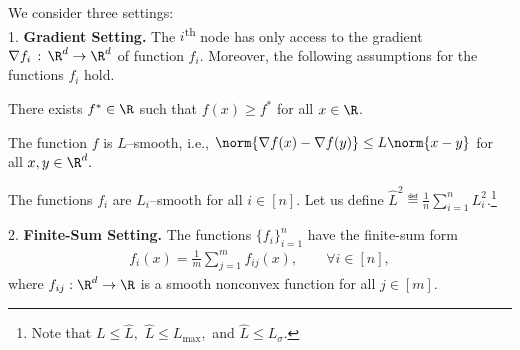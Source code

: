 \documentclass{article}
\begin{document}
We consider three settings: \\
1. \textbf{Gradient Setting.}
The $i$\textsuperscript{th} node has only access to the gradient $\nabla f_i \,:\,\R^d \rightarrow \R^d$ of function $f_i$. Moreover, the following assumptions for the functions $f_i$ hold.
\begin{assumption}
    \label{ass:lower_bound}
    There exists $f^* \in \R$ such that $f(x) \geq f^*$ for all $x \in \R$.
\end{assumption}
\begin{assumption}
    \label{ass:lipschitz_constant}
    The function $f$ is $L$--smooth, i.e., $\norm{\nabla f(x) - \nabla f(y)} \leq L \norm{x - y}$ for all $x, y \in \R^d.$
\end{assumption}
\begin{assumption} \leavevmode
    \label{ass:nodes_lipschitz_constant}
    The functions $f_i$ are $L_i$--smooth for all $i \in [n]$. Let us define $\widehat{L}^2 \eqdef \frac{1}{n} \sum_{i=1}^{n} L_i^2.$\footnote{Note that $L \leq \widehat{L},$ $\widehat{L} \leq L_{\max},$ and $\widehat{L} \leq L_{\sigma}.$}
\end{assumption}
2. \textbf{Finite-Sum Setting.}
The functions $\{f_i\}_{i=1}^n$ have the finite-sum form
\begin{align}
    \label{eq:task_minibatch} f_i(x) = \frac{1}{m}\sum \limits_{j=1}^m f_{ij}(x), \qquad \forall i \in [n],
\end{align}
where $f_{ij} :\R^d  \rightarrow \R$ is a smooth nonconvex  function for all $j \in [m].$
\end{document}

